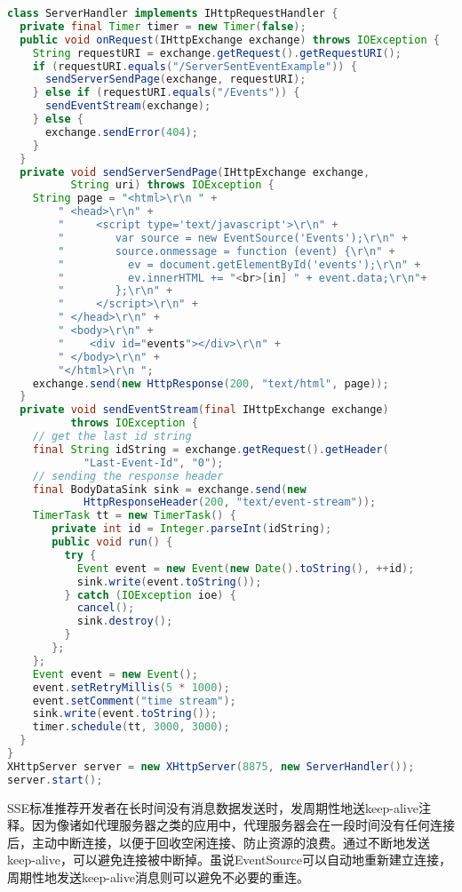 \begin{lstlisting}[caption={SSE服务器示例}, label=sse-server, language=java]
class ServerHandler implements IHttpRequestHandler {
  private final Timer timer = new Timer(false);
  public void onRequest(IHttpExchange exchange) throws IOException {
    String requestURI = exchange.getRequest().getRequestURI();
    if (requestURI.equals("/ServerSentEventExample")) {
      sendServerSendPage(exchange, requestURI);
    } else if (requestURI.equals("/Events")) {
      sendEventStream(exchange);
    } else {
      exchange.sendError(404);
    }
  }
  private void sendServerSendPage(IHttpExchange exchange, 
          String uri) throws IOException {
    String page = "<html>\r\n " +
        " <head>\r\n" +
        "     <script type='text/javascript'>\r\n" +
        "        var source = new EventSource('Events');\r\n" +
        "        source.onmessage = function (event) {\r\n" +
        "          ev = document.getElementById('events');\r\n" +
        "          ev.innerHTML += "<br>[in] " + event.data;\r\n"+
        "        };\r\n" +
        "     </script>\r\n" +
        " </head>\r\n" +
        " <body>\r\n" +
        "    <div id="events"></div>\r\n" +
        " </body>\r\n" +
        "</html>\r\n ";
    exchange.send(new HttpResponse(200, "text/html", page));
  }
  private void sendEventStream(final IHttpExchange exchange) 
          throws IOException {
    // get the last id string
    final String idString = exchange.getRequest().getHeader(
            "Last-Event-Id", "0");
    // sending the response header
    final BodyDataSink sink = exchange.send(new 
            HttpResponseHeader(200, "text/event-stream"));
    TimerTask tt = new TimerTask() {
       private int id = Integer.parseInt(idString);
       public void run() {
         try {
           Event event = new Event(new Date().toString(), ++id);
           sink.write(event.toString());
         } catch (IOException ioe) {
           cancel();
           sink.destroy();
         }
       };
    };
    Event event = new Event();
    event.setRetryMillis(5 * 1000);
    event.setComment("time stream");
    sink.write(event.toString());
    timer.schedule(tt, 3000, 3000);
  }
}
XHttpServer server = new XHttpServer(8875, new ServerHandler());
server.start();
\end{lstlisting}

SSE标准推荐开发者在长时间没有消息数据发送时，发周期性地送keep-alive注释。因为像诸如代理服务器之类的应用中，代理服务器会在一段时间没有任何连接后，主动中断连接，以便于回收空闲连接、防止资源的浪费。通过不断地发送keep-alive，可以避免连接被中断掉。虽说EventSource可以自动地重新建立连接，周期性地发送keep-alive消息则可以避免不必要的重连。

